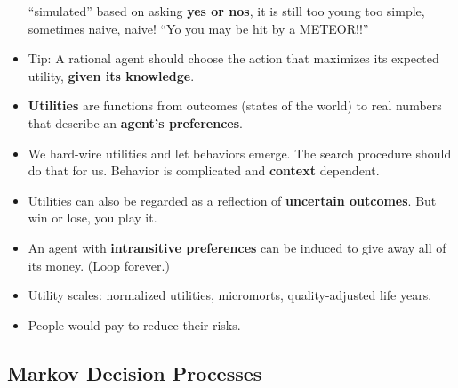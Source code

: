 \documentclass[twocolumn]{article}
\begin{document}
\begin{itemize}
  ``simulated'' based on asking \textbf{yes or nos}, it is still too
  young too simple, sometimes naive, naive! ``Yo you may be hit by a
  METEOR!!'' 
\item Tip: A rational agent should choose the action that maximizes
  its expected utility, \textbf{given its knowledge}.
\item \textbf{Utilities} are functions from outcomes (states of the
  world) to real numbers that describe an \textbf{agent's
    preferences}.
\item We hard-wire utilities and let behaviors emerge. The search
  procedure should do that for us. Behavior is complicated and
  \textbf{context} dependent.
\item Utilities can also be regarded as a reflection of
  \textbf{uncertain outcomes}. But win or lose, you play it.
\item An agent with \textbf{intransitive preferences} can be induced
  to give away all of its money. (Loop forever.)
\item Utility scales: normalized utilities, micromorts,
  quality-adjusted life years.
\item People would pay to reduce their risks.
\end{itemize}

\subsection{Markov Decision Processes}
\label{sec:mark-decis-proc}
\end{document}
